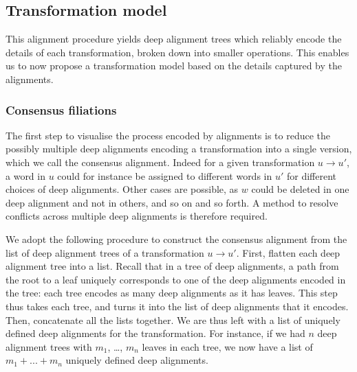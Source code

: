 \subsection{Transformation model}\label{transformation-model}

This alignment procedure yields deep alignment trees which reliably encode the details of
each transformation, broken down into smaller operations. This enables us to now propose a transformation model based on the details captured by the alignments.

\subsubsection{Consensus filiations}\label{consensus-filiations}

The first step to visualise the process encoded by alignments is to
reduce the possibly multiple deep alignments encoding a transformation
into a single version, which we call the consensus alignment. Indeed for
a given transformation \(u \rightarrow u'\), a word in \(u\) could for
instance be assigned to different words in \(u'\) for different choices
of deep alignments. Other cases are possible, as \(w\) could be deleted
in one deep alignment and not in others, and so on and so forth. A
method to resolve conflicts across multiple deep alignments is therefore
required.

We adopt the following procedure to construct the consensus alignment
from the list of deep alignment trees of a transformation
\(u \rightarrow u'\). First, flatten each deep alignment tree into a
list. Recall that in a tree of deep alignments, a path from the root to
a leaf uniquely corresponds to one of the deep alignments encoded in the
tree: each tree encodes as many deep alignments as it has leaves. This
step thus takes each tree, and turns it into the list of deep alignments
that it encodes. Then, concatenate all the lists together. We are thus
left with a list of uniquely defined deep alignments for the
transformation. For instance, if we had \(n\) deep alignment trees with
\(m_1\), \ldots{}, \(m_n\) leaves in each tree, we now have a list of
\(m_1 + ... + m_n\) uniquely defined deep alignments.

